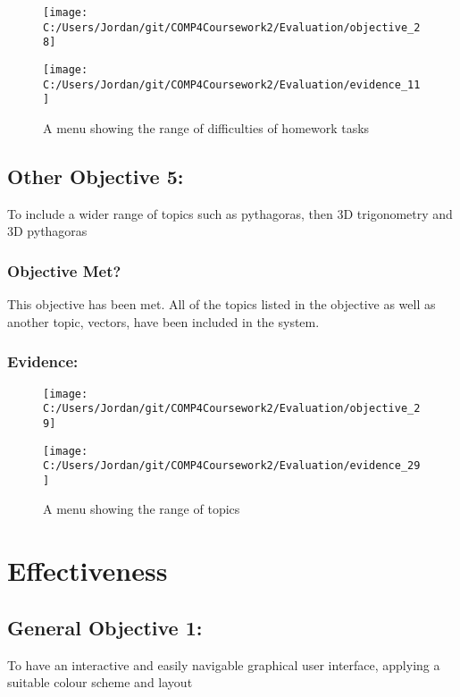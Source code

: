 \begin{figure}[H]
	\texttt{[image: C:/Users/Jordan/git/COMP4Coursework2/Evaluation/objective\_28]}
\end{figure}

\begin{figure}[H]
	\texttt{[image: C:/Users/Jordan/git/COMP4Coursework2/Evaluation/evidence\_11]}
	\caption{A menu showing the range of difficulties of homework tasks}
\end{figure}

\subsection{Other Objective 5: }

To include a wider range of topics such as pythagoras, then 3D trigonometry and 3D pythagoras

\subsubsection{Objective Met?}

This objective has been met. All of the topics listed in the objective as well as another topic, vectors, have been included in the system.

\subsubsection{Evidence: }

\begin{figure}[H]
	\texttt{[image: C:/Users/Jordan/git/COMP4Coursework2/Evaluation/objective\_29]}
\end{figure}

\begin{figure}[H]
	\texttt{[image: C:/Users/Jordan/git/COMP4Coursework2/Evaluation/evidence\_29]}
	\caption{A menu showing the range of topics}
\end{figure}

\section{Effectiveness}

\subsection{General Objective 1: }

To have an interactive and easily navigable graphical user interface, applying a suitable colour scheme and layout

